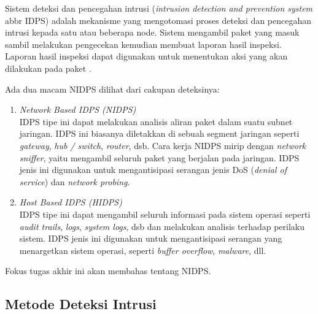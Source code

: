     Sistem deteksi dan pencegahan intrusi (\emph{intrusion detection and prevention system} abbr IDPS) adalah mekanisme yang mengotomasi proses deteksi dan pencegahan intrusi kepada satu atau beberapa node. Sistem mengambil paket yang masuk sambil melakukan pengecekan kemudian membuat laporan hasil inspeksi. Laporan hasil inspeksi dapat digunakan untuk menentukan aksi yang akan dilakukan pada paket \parencite{nist2007}.

    Ada dua macam NIDPS dilihat dari cakupan deteksinya:
    \begin{enumerate}

      \item 
      \emph{Network Based IDPS (NIDPS)} \\
      IDPS tipe ini dapat melakukan analisis aliran paket dalam suatu subnet jaringan. IDPS ini biasanya diletakkan di sebuah segment jaringan seperti \emph{gateway}, \emph{hub / switch}, \emph{router}, dsb. Cara kerja NIDPS mirip dengan \emph{network sniffer}, yaitu mengambil seluruh paket yang berjalan pada jaringan. IDPS jenis ini digunakan untuk mengantisipasi serangan jenis DoS (\emph{denial of service}) dan \emph{network probing}.

       \item 
      \emph{Host Based IDPS (HIDPS)} \\
      IDPS tipe ini dapat mengambil seluruh informasi pada sistem operasi seperti \emph{audit trails}, \emph{logs}, \emph{system logs}, dsb dan melakukan analisis terhadap perilaku sistem. IDPS jenis ini digunakan untuk mengantisipasi serangan yang menargetkan sistem operasi, seperti \emph{buffer overflow}, \emph{malware}, dll.

    \end{enumerate}

    Fokus tugas akhir ini akan membahas tentang NIDPS.

  \subsection{Metode Deteksi Intrusi}

